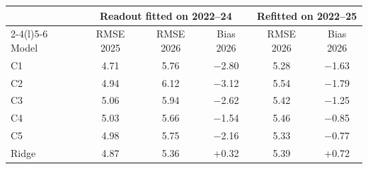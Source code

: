 \begin{tabular}{@{}lccccc@{}}
\toprule
 & \multicolumn{3}{c}{Readout fitted on 2022--24} & \multicolumn{2}{c}{Refitted on 2022--25} \\
\cmidrule(lr){2-4}\cmidrule(l){5-6}
Model & RMSE 2025 & RMSE 2026 & Bias 2026 & RMSE 2026 & Bias 2026 \\
\midrule
C1 & 4.71 & 5.76 & $-$2.80 & 5.28 & $-$1.63 \\
C2 & 4.94 & 6.12 & $-$3.12 & 5.54 & $-$1.79 \\
C3 & 5.06 & 5.94 & $-$2.62 & 5.42 & $-$1.25 \\
C4 & 5.03 & 5.66 & $-$1.54 & 5.46 & $-$0.85 \\
C5 & 4.98 & 5.75 & $-$2.16 & 5.33 & $-$0.77 \\
Ridge & 4.87 & 5.36 & +0.32 & 5.39 & +0.72 \\
\bottomrule
\end{tabular}

